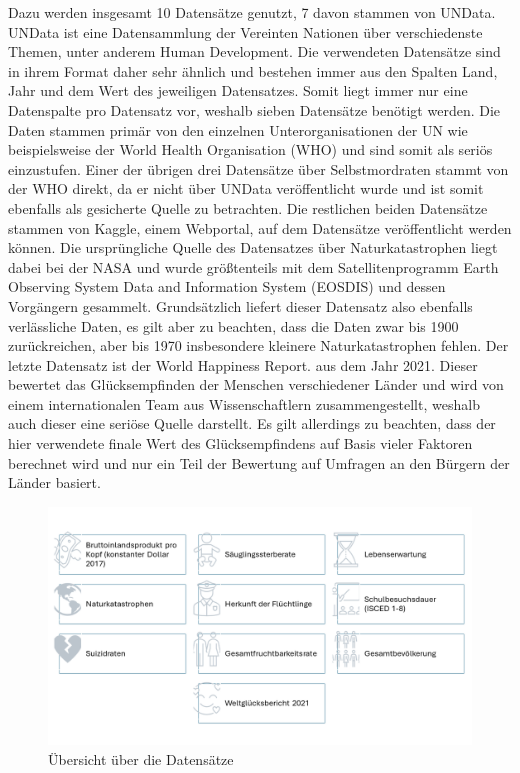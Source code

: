 \documentclass[12pt]{article}
\begin{document}
	Dazu werden insgesamt 10 Datensätze genutzt, 7 davon stammen von UNData. UNData ist eine Datensammlung der Vereinten Nationen über verschiedenste Themen, unter anderem Human Development. Die verwendeten Datensätze sind in ihrem Format daher sehr ähnlich und bestehen immer aus den Spalten Land, Jahr und dem Wert des jeweiligen Datensatzes. Somit liegt immer nur eine Datenspalte pro Datensatz vor, weshalb sieben Datensätze benötigt werden. Die Daten stammen primär von den einzelnen Unterorganisationen der UN wie beispielsweise der World Health Organisation (WHO) und sind somit als seriös einzustufen. Einer der übrigen drei Datensätze über Selbstmordraten stammt von der WHO direkt, da er nicht über UNData veröffentlicht wurde und ist somit ebenfalls als gesicherte Quelle zu betrachten. Die restlichen beiden Datensätze stammen von Kaggle, einem Webportal, auf dem Datensätze veröffentlicht werden können. Die ursprüngliche Quelle des Datensatzes über Naturkatastrophen liegt dabei bei der NASA und wurde größtenteils mit dem Satellitenprogramm Earth Observing System Data and Information System (EOSDIS) und dessen Vorgängern gesammelt. Grundsätzlich liefert dieser Datensatz also ebenfalls verlässliche Daten, es gilt aber zu beachten, dass die Daten zwar bis 1900 zurückreichen, aber bis 1970 insbesondere kleinere Naturkatastrophen fehlen. Der letzte Datensatz ist der World Happiness Report.
	aus dem Jahr 2021. Dieser bewertet das Glücksempfinden der Menschen verschiedener Länder und wird von einem internationalen Team aus Wissenschaftlern zusammengestellt, weshalb auch dieser eine seriöse Quelle darstellt. Es gilt allerdings zu beachten, dass der hier verwendete finale Wert des Glücksempfindens auf Basis vieler Faktoren berechnet wird und nur ein Teil der Bewertung auf Umfragen an den Bürgern der Länder basiert.
	
	\begin{figure}[h]
		\centering
		\includegraphics[width=1.0\textwidth]{Daten}
		\caption{Übersicht über die Datensätze}
	\end{figure}
	
\end{document}
